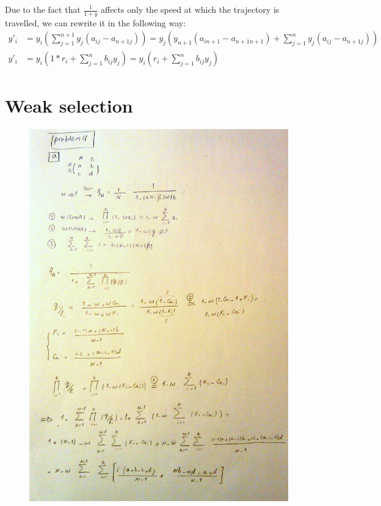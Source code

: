 Due to the fact that $\frac{1}{1+y}$ affects only the speed at which the trajectory is travelled, we can rewrite it in the following way:
\begin{align*} 
y'_i &= y_i \left( \sum\limits_{j=1}^{n+1} y_j(a_{ij}-a_{n+1j}) \right) = y_j \left( y_{n+1}(a_{in+1}-a_{n+1n+1}) + \sum\limits_{j=1}^{n} y_j(a_{ij}-a_{n+1j})\right)\\
y'_i &= y_i(1*r_i + \sum\limits_{j=1}^{n} b_{ij}y_{j}) = y_i\left(r_i+\sum\limits_{j=1}^{n} b_{ij}y_j \right)
\end{align*}

\setcounter{chapter}{4}
\setcounter{section}{0}
\section{Weak selection}
\begin{figure}[hp]
\centering
\includegraphics[scale=0.23]{./img/1}
\end{figure}
